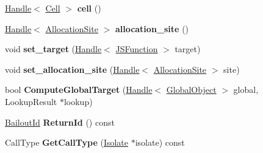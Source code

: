 \begin{DoxyCompactItemize}
\item 
\hypertarget{classv8_1_1internal_1_1_v8___f_i_n_a_l_acfffe09b9b46ad4a299e6d3059f22b69}{}\hyperlink{classv8_1_1internal_1_1_handle}{Handle}$<$ \hyperlink{classv8_1_1internal_1_1_cell}{Cell} $>$ {\bfseries cell} ()\label{classv8_1_1internal_1_1_v8___f_i_n_a_l_acfffe09b9b46ad4a299e6d3059f22b69}

\item 
\hypertarget{classv8_1_1internal_1_1_v8___f_i_n_a_l_a93d1ba531d09059071f2284a272b4b06}{}\hyperlink{classv8_1_1internal_1_1_handle}{Handle}$<$ \hyperlink{classv8_1_1internal_1_1_allocation_site}{Allocation\+Site} $>$ {\bfseries allocation\+\_\+site} ()\label{classv8_1_1internal_1_1_v8___f_i_n_a_l_a93d1ba531d09059071f2284a272b4b06}

\item 
\hypertarget{classv8_1_1internal_1_1_v8___f_i_n_a_l_a08c9a42b6f65fe4fc9f351b62c124288}{}void {\bfseries set\+\_\+target} (\hyperlink{classv8_1_1internal_1_1_handle}{Handle}$<$ \hyperlink{classv8_1_1internal_1_1_j_s_function}{J\+S\+Function} $>$ target)\label{classv8_1_1internal_1_1_v8___f_i_n_a_l_a08c9a42b6f65fe4fc9f351b62c124288}

\item 
\hypertarget{classv8_1_1internal_1_1_v8___f_i_n_a_l_a33a7c12dd1bd8d1bd822552b09f2b2d4}{}void {\bfseries set\+\_\+allocation\+\_\+site} (\hyperlink{classv8_1_1internal_1_1_handle}{Handle}$<$ \hyperlink{classv8_1_1internal_1_1_allocation_site}{Allocation\+Site} $>$ site)\label{classv8_1_1internal_1_1_v8___f_i_n_a_l_a33a7c12dd1bd8d1bd822552b09f2b2d4}

\item 
\hypertarget{classv8_1_1internal_1_1_v8___f_i_n_a_l_ab0fb496b0d76560dce67b9f54536a83d}{}bool {\bfseries Compute\+Global\+Target} (\hyperlink{classv8_1_1internal_1_1_handle}{Handle}$<$ \hyperlink{classv8_1_1internal_1_1_global_object}{Global\+Object} $>$ global, Lookup\+Result $\ast$lookup)\label{classv8_1_1internal_1_1_v8___f_i_n_a_l_ab0fb496b0d76560dce67b9f54536a83d}

\item 
\hypertarget{classv8_1_1internal_1_1_v8___f_i_n_a_l_a2c7f2293c16baf5e7d5921269f45a96c}{}\hyperlink{classv8_1_1internal_1_1_bailout_id}{Bailout\+Id} {\bfseries Return\+Id} () const \label{classv8_1_1internal_1_1_v8___f_i_n_a_l_a2c7f2293c16baf5e7d5921269f45a96c}

\item 
\hypertarget{classv8_1_1internal_1_1_v8___f_i_n_a_l_ab69f366062866b0fda214242541b1287}{}Call\+Type {\bfseries Get\+Call\+Type} (\hyperlink{classv8_1_1internal_1_1_isolate}{Isolate} $\ast$isolate) const \label{classv8_1_1internal_1_1_v8___f_i_n_a_l_ab69f366062866b0fda214242541b1287}


\end{DoxyCompactItemize}
